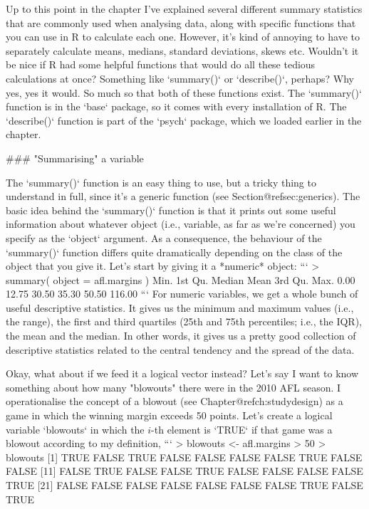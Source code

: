 Up to this point in the chapter I've explained several different summary statistics that are commonly used when analysing data, along with specific functions that you can use in R to calculate each one. However, it's kind of annoying to have to separately calculate means, medians, standard deviations, skews etc. Wouldn't it be nice if R had some helpful functions that would do all these tedious calculations at once? Something like `summary()` or `describe()`, perhaps? Why yes, yes it would. So much so that both of these functions exist. The `summary()` function is in the `base` package, so it comes with every installation of R. The `describe()` function is part of the `psych` package, which we loaded earlier in the chapter.



### "Summarising" a variable

The `summary()` function is an easy thing to use, but a tricky thing to understand in full, since it's a generic function (see Section@refsec:generics). The basic idea behind the `summary()` function is that it prints out some useful information about whatever object (i.e., variable, as far as we're concerned) you specify as the `object` argument. As a consequence, the behaviour of the `summary()` function differs quite dramatically depending on the class of the object that you give it. Let's start by giving it a *numeric* object:
```
> summary( object = afl.margins )  
   Min. 1st Qu.  Median    Mean 3rd Qu.    Max. 
   0.00   12.75   30.50   35.30   50.50  116.00 
```
For numeric variables, we get a whole bunch of useful descriptive statistics. It gives us the minimum and maximum values (i.e., the range), the first and third quartiles (25th and 75th percentiles; i.e., the IQR), the mean and the median. In other words, it gives us a pretty good collection of descriptive statistics related to the central tendency and the spread of the data.

Okay, what about if we feed it a logical vector instead? Let's say I want to know something about how many "blowouts" there were in the 2010 AFL season. I operationalise the concept of a blowout (see Chapter@refch:studydesign) as a game in which the winning margin exceeds 50 points. Let's create a logical variable `blowouts` in which the $i$-th element is `TRUE` if that game was a blowout according to my definition, 
```
> blowouts <-  afl.margins > 50
> blowouts
  [1]  TRUE FALSE  TRUE FALSE FALSE FALSE FALSE  TRUE FALSE FALSE
 [11] FALSE  TRUE FALSE FALSE  TRUE FALSE FALSE FALSE FALSE  TRUE
 [21] FALSE FALSE FALSE FALSE FALSE FALSE FALSE  TRUE FALSE  TRUE
 
